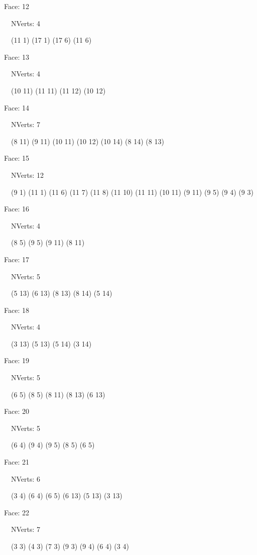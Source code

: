\documentclass{article}
\begin{document}
{\footnotesize 

Face: 12

\   \    NVerts: 4

 \   \   (11 1) (17 1) (17 6) (11 6)}

{\footnotesize 

Face: 13

\   \    NVerts: 4

 \   \   (10 11) (11 11) (11 12) (10 12)}

{\footnotesize 

Face: 14

\   \    NVerts: 7

 \   \   (8 11) (9 11) (10 11) (10 12) (10 14) (8 14) (8 13)}

{\footnotesize 

Face: 15

\   \    NVerts: 12

 \   \   (9 1) (11 1) (11 6) (11 7) (11 8) (11 10) (11 11) (10 11) (9 11) (9 5) (9 4) (9 3)}

{\footnotesize 

Face: 16

\   \    NVerts: 4

 \   \   (8 5) (9 5) (9 11) (8 11)}

{\footnotesize 

Face: 17

\   \    NVerts: 5

 \   \   (5 13) (6 13) (8 13) (8 14) (5 14)}

{\footnotesize 

Face: 18

\   \    NVerts: 4

 \   \   (3 13) (5 13) (5 14) (3 14)}

{\footnotesize 

Face: 19

\   \    NVerts: 5

 \   \   (6 5) (8 5) (8 11) (8 13) (6 13)}

{\footnotesize 

Face: 20

\   \    NVerts: 5

 \   \   (6 4) (9 4) (9 5) (8 5) (6 5)}

{\footnotesize 

Face: 21

\   \    NVerts: 6

 \   \   (3 4) (6 4) (6 5) (6 13) (5 13) (3 13)}

{\footnotesize 

Face: 22

\   \    NVerts: 7

 \   \   (3 3) (4 3) (7 3) (9 3) (9 4) (6 4) (3 4)}
\end{document}
